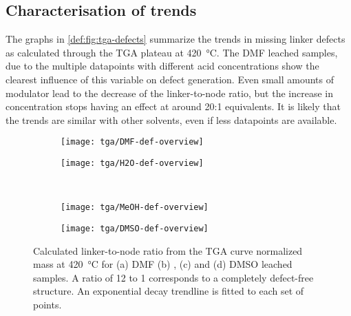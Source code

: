 
\subsection{Characterisation of trends}\label{def:trends}

The graphs in \autoref{def:fig:tga-defects} summarize the 
trends in missing linker defects as calculated through 
the TGA plateau at \SI{420}{\degreeCelsius}. The DMF leached samples,
due to the multiple datapoints with different acid concentrations
show the clearest influence of this variable on defect
generation. Even small amounts of modulator lead to the decrease of 
the linker-to-node ratio, but the increase in concentration stops 
having an effect at around 20:1 equivalents. It is likely that
the trends are similar with other solvents, even if less 
datapoints are available.

\begin{figure}[htb]
    \centering

    \begin{subfigure}{0.33\linewidth}
		\parbox[c]{0.12\linewidth}{\caption{}%
			\label{def:fig:tga-dmf-linkers}}%
		\parbox[b]{0.88\linewidth}{%
			\texttt{[image: tga/DMF-def-overview]}%
		}%
    \end{subfigure}%
    \begin{subfigure}{0.33\linewidth}
		\parbox[c]{0.12\linewidth}{\caption{}%
			\label{def:fig:tga-h2o-linkers}}%
		\parbox[b]{0.88\linewidth}{%
			\texttt{[image: tga/H2O-def-overview]}%
		}%
    \end{subfigure}%
    \\
    \begin{subfigure}{0.33\linewidth}
		\parbox[c]{0.12\linewidth}{\caption{}%
			\label{def:fig:tga-meoh-linkers}}%
		\parbox[b]{0.88\linewidth}{%
			\texttt{[image: tga/MeOH-def-overview]}%
		}%
    \end{subfigure}%
    \begin{subfigure}{0.33\linewidth}
		\parbox[c]{0.12\linewidth}{\caption{}%
			\label{def:fig:tga-dmso-linkers}}%
		\parbox[b]{0.88\linewidth}{%
			\texttt{[image: tga/DMSO-def-overview]}%
		}%
    \end{subfigure}%

    \caption{Calculated linker-to-node ratio from the TGA curve 
    normalized mass at \SI{420}{\degreeCelsius} for (a) DMF 
    (b) , (c)  and (d) DMSO leached samples.
    A ratio of 12 to 1 corresponds to a completely defect-free
    structure. An exponential decay trendline is fitted to 
    each set of points.}%
    \label{def:fig:tga-defects}
    
\end{figure}

